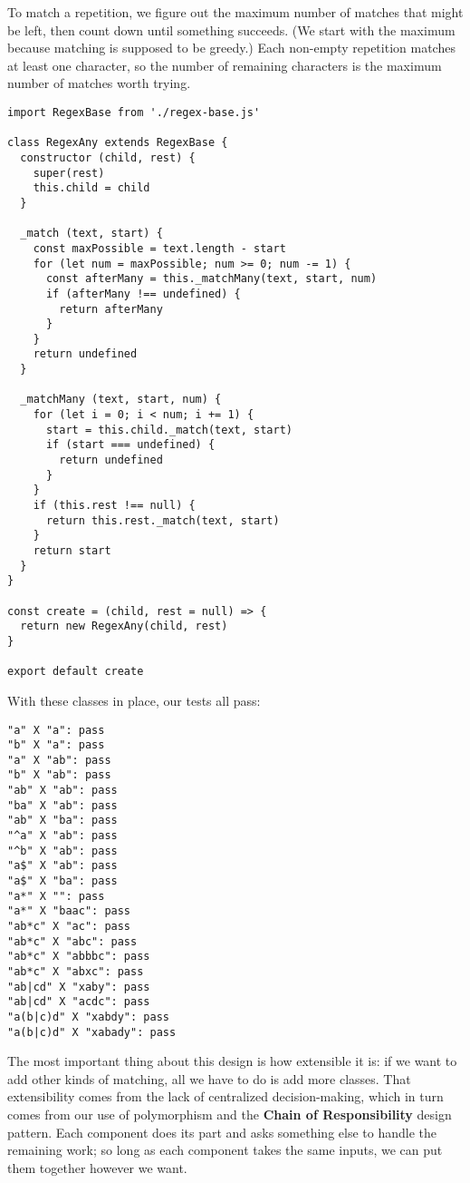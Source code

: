\documentclass[krantzl]{krantz}
\newcommand{\glossref}[1]{\textbf{#1}}
\begin{document}
To match a repetition,
we figure out the maximum number of matches that might be left,
then count down until something succeeds.
(We start with the maximum because matching is supposed to be greedy.)
Each non-empty repetition matches at least one character,
so the number of remaining characters is the maximum number of matches worth trying.


\begin{lstlisting}[frame=single,frameround=tttt]
import RegexBase from './regex-base.js'

class RegexAny extends RegexBase {
  constructor (child, rest) {
    super(rest)
    this.child = child
  }

  _match (text, start) {
    const maxPossible = text.length - start
    for (let num = maxPossible; num >= 0; num -= 1) {
      const afterMany = this._matchMany(text, start, num)
      if (afterMany !== undefined) {
        return afterMany
      }
    }
    return undefined
  }

  _matchMany (text, start, num) {
    for (let i = 0; i < num; i += 1) {
      start = this.child._match(text, start)
      if (start === undefined) {
        return undefined
      }
    }
    if (this.rest !== null) {
      return this.rest._match(text, start)
    }
    return start
  }
}

const create = (child, rest = null) => {
  return new RegexAny(child, rest)
}

export default create
\end{lstlisting}



With these classes in place,
our tests all pass:


\begin{lstlisting}[frame=single,frameround=tttt]
"a" X "a": pass
"b" X "a": pass
"a" X "ab": pass
"b" X "ab": pass
"ab" X "ab": pass
"ba" X "ab": pass
"ab" X "ba": pass
"^a" X "ab": pass
"^b" X "ab": pass
"a$" X "ab": pass
"a$" X "ba": pass
"a*" X "": pass
"a*" X "baac": pass
"ab*c" X "ac": pass
"ab*c" X "abc": pass
"ab*c" X "abbbc": pass
"ab*c" X "abxc": pass
"ab|cd" X "xaby": pass
"ab|cd" X "acdc": pass
"a(b|c)d" X "xabdy": pass
"a(b|c)d" X "xabady": pass
\end{lstlisting}



The most important thing about this design is how extensible it is:
if we want to add other kinds of matching,
all we have to do is add more classes.
That extensibility comes from the lack of centralized decision-making,
which in turn comes from our use of polymorphism
and the \glossref{Chain of Responsibility} design pattern.
Each component does its part and asks something else to handle the remaining work;
so long as each component takes the same inputs,
we can put them together however we want.
\end{document}
